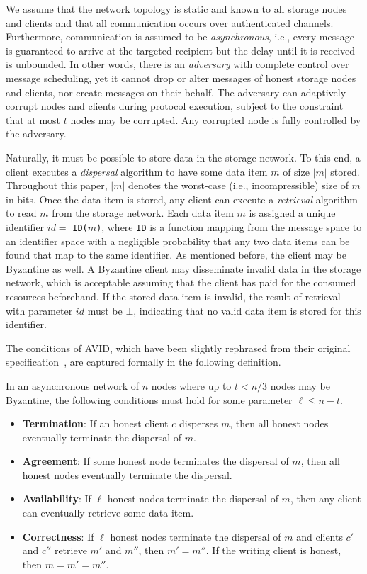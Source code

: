 \documentclass[sigconf,screen]{acmart}
\begin{document}
We assume that the network topology is static and known to all storage nodes and clients and that all communication occurs over authenticated channels. Furthermore, communication is assumed to be \emph{asynchronous}, i.e., every message is guaranteed to arrive at the targeted recipient but the delay until it is received is unbounded.
In other words, there is an \emph{adversary} with complete control over message scheduling, yet it cannot drop or alter messages of honest storage nodes and clients, nor create messages on their behalf. The adversary can adaptively corrupt nodes and clients during protocol execution, subject to the constraint that at most $t$ nodes may be corrupted. Any corrupted node is fully controlled by the adversary.

Naturally, it must be possible to store data in the storage network. To this end, a client executes a \emph{dispersal} algorithm to have some data item $m$ of size $|m|$ stored. Throughout this paper, $|m|$ denotes the worst-case (i.e., incompressible) size of $m$ in bits. Once the data item is stored, any client can execute a \emph{retrieval} algorithm to read $m$ from the storage network.
Each data item $m$ is assigned a unique identifier $id =$ \texttt{ID($m$)}, where \texttt{ID} is a function mapping from the message space to an identifier space with a negligible probability that any two data items can be found that map to the same identifier.
As mentioned before, the client may be Byzantine as well. A Byzantine client may disseminate invalid data in the storage network, which is acceptable assuming that the client has paid for the consumed resources beforehand.
If the stored data item is invalid, the result of retrieval with parameter $id$ must be $\bot$, indicating that no valid data item is stored for this identifier.

The conditions of AVID, which have been slightly rephrased from their original specification~\cite{cachin2005}, are captured formally in the following definition.

\begin{definition}\label{def:avid} In an asynchronous network of $n$ nodes where up to $t < n/3$ nodes may be Byzantine, the following conditions must hold for some parameter $\ell \le n-t$.
\begin{itemize}
 \item \textbf{Termination}: If an honest client $c$ disperses $m$, then all honest nodes eventually terminate the dispersal of $m$.
 \item \textbf{Agreement}: If some honest node terminates the dispersal of $m$, then all honest nodes eventually terminate the dispersal.
 \item \textbf{Availability}: If $\ell$ honest nodes terminate the dispersal of $m$, then any client can eventually retrieve some data item.
 \item \textbf{Correctness}: If $\ell$ honest nodes terminate the dispersal of $m$ and clients $c'$ and $c''$ retrieve $m'$ and $m''$, then $m' = m''$. If the writing client is honest, then $m = m' = m''$.
\end{itemize}
\end{definition}
\end{document}

